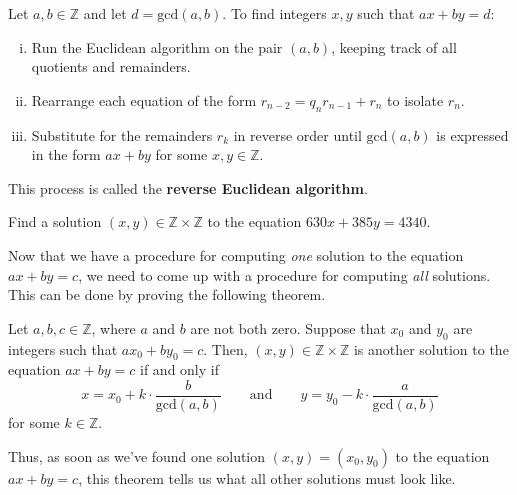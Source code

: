 \begin{prooftip}
Let $a,b \in \mathbb{Z}$ and let $d = \mathrm{gcd}(a,b)$. To find integers $x,y$ such that $ax+by=d$:
\begin{enumerate}[(i)]
\item Run the Euclidean algorithm on the pair $(a,b)$, keeping track of all quotients and remainders.
\item Rearrange each equation of the form $r_{n-2} = q_nr_{n-1}+r_n$ to isolate $r_n$.
\item Substitute for the remainders $r_k$ in reverse order until $\mathrm{gcd}(a,b)$ is expressed in the form $ax+by$ for some $x,y \in \mathbb{Z}$.
\end{enumerate}
This process is called the \textbf{reverse Euclidean algorithm}.
\end{prooftip}

\begin{exercise}
Find a solution $(x,y) \in \mathbb{Z} \times \mathbb{Z}$ to the equation $630x + 385y = 4340$.
\end{exercise}

Now that we have a procedure for computing \textit{one} solution to the equation $ax+by=c$, we need to come up with a procedure for computing \textit{all} solutions. This can be done by proving the following theorem.

\begin{theorem}
\label{thmAllSolutionsOfLDEFromOneSolution}
Let $a,b,c \in \mathbb{Z}$, where $a$ and $b$ are not both zero. Suppose that $x_0$ and $y_0$ are integers such that $ax_0+by_0 = c$. Then, $(x,y) \in \mathbb{Z} \times \mathbb{Z}$ is another solution to the equation $ax+by=c$ if and only if
\[ x = x_0 + k \cdot \frac{b}{\mathrm{gcd}(a,b)} \qquad \text{and} \qquad y = y_0 - k \cdot \frac{a}{\mathrm{gcd}(a,b)} \]
for some $k \in \mathbb{Z}$.
\end{theorem}

Thus, as soon as we've found one solution $(x,y)=(x_0,y_0)$ to the equation $ax+by=c$, this theorem tells us what all other solutions must look like.

